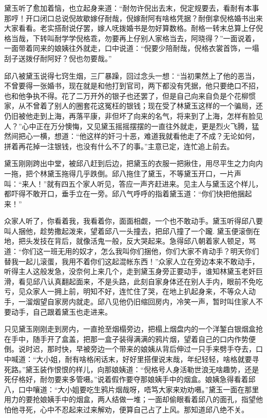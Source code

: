 \documentclass[12pt,UTF8]{ctexbook}
\begin{document}
{{{黛玉听了愈加着恼，也立起身来道：“耐勿许倪出去末，倪定规要去，看耐有本事那哼！开口闭口总说倪故歇嫁仔耐哉，倪嫁耐阿有啥格凭据？耐倒拿倪格婚书出来大家看看。老实搭耐说仔罢，嫁人呒拨婚书是勿好算数格。耐格一转末总算上仔倪格当哉，下转叫耐学学倪格乖，勿要再上仔别人家格当去，阿晓得？”一面说着，一面带着同来的娘姨往外就走，口中说道：“倪要少陪耐哉，倪格衣裳首饰，一塌刮子送拨仔耐阿好？倪也勿要哉。”

邱八被黛玉说得七窍生烟，三厂暴躁，回过念头一想：“当初果然上了他的恶当，不曾要得一张婚书，现在就是和他打到官司，两下都没有凭据，他只要绝口不招，也和他争执不得。花了二万开外的银子也还罢了，但是自己向来自负是个花柳惯家，从不曾着了别人的圈套花这冤枉的银钱；现在受了林黛玉这样的一个骗局，还仍旧被他走到上海，再落平康，非但坏了向来的名气，将来到了上海，怎样有脸见人？”心中正在万分懊悔，又见黛玉摇摇摆摆的一直往外就走，更是烈火飞腾，猛然间把心一横，想道：“他这样的奸刁十恶，难道我就看他走了不成？无论如何，拼着再花掉一注银钱，也没有什么不了的事。”主意已定，连忙追上前去。

黛玉刚刚跨出中堂，被邱八赶到后边，把黛玉的衣服一把揪住，用尽平生之力向内一拖，把个林黛玉拖得几乎跌倒。邱八拖住了黛玉，不等黛玉开口，一片声叫：“来人！”就有四五个家人听见，答应一声齐赶进来。见主人与黛玉这个样儿，都吓得不敢开口，垂手立在一旁。邱八气呼呼的指着黛玉道：“你们快把他捆起来！”

众家人听了，你看着我，我看着你，面面相觑，一个也不敢动手。黛玉听得邱八要叫人捆他，趁势撒起泼来，望着邱八一头撞去，把邱八撞了一个躘. 黛玉便滚倒在地，把头发技在背后，就像活鬼一般，反大哭起来。急得邱八朝着家人顿足，骂道：“你们这一班无用的奴才，怎么我叫你们捆他，你们大家不肯动手？明天你们替我一起儿滚蛋，我用不着你们这起混帐东西！”众家人立在旁边本来不敢动手，听得主人这般发急，没奈何上来几个，走到黛玉身旁正要动手，谁知林黛玉老奸巨滑，看见邱八认真翻起面来，不是头路，此刻自家身体还在别人手内，眼前不免吃亏，见众家人一拥上前，明知不好，连忙住了哭，在地上扒起身来，不等众人动手，一溜烟望自家房内就走。邱八见他仍旧缩回房内，冷笑一声，暂时叫住家人不要动手，自己跟着黛玉也走进来。

只见黛玉刚刚走到房内，一直抢至烟榻旁边，把榻上烟盘内的一个洋錾白银烟盒抢在手中，随手开了盒盖，把那一盒子装得满满的鸦片烟，望着自己的口内作势便倒。说时迟，那时快，早被旁边一个带来的娘姨从背后伸过一只手来劈手夺去，口中喊道：“大小姐，耐有啥格闲话末，好好里搭俚说末哉，年纪轻轻，啥格就要寻死路。”黛玉装作恨恨的样儿，向那娘姨道：“倪格号人身活勒世浪无啥趣势，还是死仔格好，耐勿要来多管嗫。”说着假作要夺那娘姨手中的烟盒。娘姨急得看着邱八，口中嚷道：“大小姐要吃生鸦片烟哉呀，唔笃大家来劝劝嗫。”黛玉一面在那里用力的要抢娘姨手中的烟盒，两人结做一堆；一面却偷眼看着邱八的面孔，指望他怕他寻死，心中不忍起来过来解劝，便算自己占了上风。那知道邱八绝不关。

}}}
\end{document}

